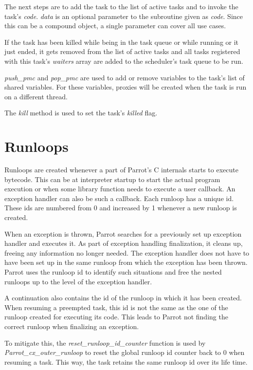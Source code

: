 \documentclass[bachelor,english]{hgbthesis}
\begin{document}
The next steps are to add the task to the list of active tasks and to invoke the task's \textit{code}. \textit{data} is an optional parameter to the subroutine given as \textit{code}. Since this can be a compound object, a single parameter can cover all use cases.

If the task has been killed while being in the task queue or while running or it just ended, it gets removed from the list of active tasks and all tasks registered with this task's \textit{waiters} array are added to the scheduler's task queue to be run.

\textit{push\_pmc} and \textit{pop\_pmc} are used to add or remove variables to the task's list of shared variables. For these variables, proxies will be created when the task is run on a different thread.

The \textit{kill} method is used to set the task's \textit{killed} flag.

\section{Runloops}

Runloops are created whenever a part of Parrot's C internals starts to execute bytecode. This can be at interpreter startup to start the actual program execution or when some library function needs to execute a user callback. An exception handler can also be such a callback. Each runloop has a unique id. These ids are numbered from 0 and increased by 1 whenever a new runloop is created.

When an exception is thrown, Parrot searches for a previously set up exception handler and executes it. As part of exception handling finalization, it cleans up, freeing any information no longer needed. The exception handler does not have to have been set up in the same runloop from which the exception has been thrown. Parrot uses the runloop id to identify such situations and free the nested runloops up to the level of the exception handler.

A continuation also contains the id of the runloop in which it has been created. When resuming a preempted task, this id is not the same as the one of the runloop created for executing its code. This leads to Parrot not finding the correct runloop when finalizing an exception.

To mitigate this, the \textit{reset\_runloop\_id\_counter} function is used by \textit{Parrot\_cx\_outer\_runloop} to reset the global runloop id counter back to 0 when resuming a task. This way, the task retains the same runloop id over its life time.
\end{document}
